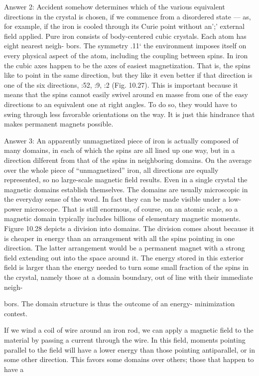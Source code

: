 {{{%
Answer 2: Accident somehow determines which of the various
equivalent directions in the crystal is chosen, if we commence from
a disordered state --- as, for example, if the iron is cooled through its
Curie point without an';' external field applied. Pure iron consists of
body-centered cubic crystals. Each atom has eight nearest neigh-
bors. The symmetry .11‘ the environment imposes itself on every
physical aspect of the atom, including the coupling between spins.
In iron the cubic axes happen to be the axes of easiest magnetization.
That is, the spins like to point in the same direction, but they like
it even better if that direction is one of the six directions, :52, :9,
:2 (Fig. 10.27). This is important because it means that the spins
cannot easily swivel around en masse from one of the easy directions
to an equivalent one at right angles. To do so, they would have to
swing through less favorable orientations on the way. It is just this
hindrance that makes permanent magnets possible.

Answer 3: An apparently unmagnetized piece of iron is actually
composed of many domains, in each of which the spins are all lined
up one way, but in a direction dilferent from that of the spins in
neighboring domains. On the average over the whole piece of
``unmagnetized'' iron, all directions are equally represented, so no
large-scale magnetic field results. Even in a single crystal the magnetic
domains establish themselves. The domains are usually microscopic
in the everyday sense of the word. In fact they can be made
visible under a low-power microscope. That is still enormous, of
course, on an atomic scale, so a magnetic domain typically includes
billions of elementary magnetic moments. Figure 10.28 depicts a
division into domains. The division comes about because it is
cheaper in energy than an arrangement with all the spins pointing
in one direction. The latter arrangement would be a permanent
magnet with a strong field extending out into the space around it.
The energy stored in this exterior field is larger than the energy
needed to turn some small fraction of the spins in the crystal, namely
those at a domain boundary, out of line with their immediate neigh-

bors. The domain structure is thus the outcome of an energy-
minimization contest.

If we wind a coil of wire around an iron rod, we can apply a magnetic
field to the material by passing a current through the wire. In
this field, moments pointing parallel to the field will have a lower
energy than those pointing antiparallel, or in some other direction.
This favors some domains over others; those that happen to have a

}}}
